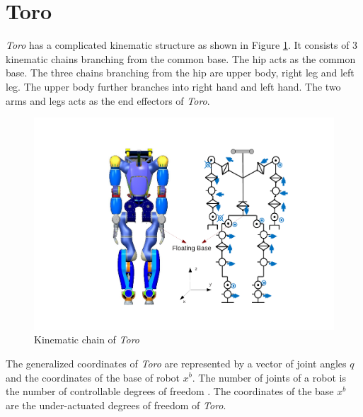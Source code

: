 \section{Toro}
\emph{Toro} has a complicated kinematic structure as shown in Figure \ref{fig:toro_kin}. It consists of 3 kinematic chains branching from the common base. The hip acts as the common base. The three chains branching from the hip are  upper body, right leg and left leg. The upper body further branches into right hand and left hand. The two arms and legs acts as the end effectors of \emph{Toro}.

\begin{figure}
\begin{center}
\includegraphics[trim= 70mm 10mm 40mm 10mm,clip,scale=0.7]{Bilder/TORO_kinematic.pdf}
\caption[Kinematic chain of \emph{Toro}]{Kinematic chain of \emph{Toro} \footnotemark }
\label{fig:toro_kin}
\end{center}
\end{figure}
The generalized coordinates of \emph{Toro} are represented by a vector of joint angles $q$ and the coordinates of the base of robot $x^b$. The number of joints of a robot is the number of controllable degrees of freedom \cite[Chapter 2]{mur94}. The coordinates of the base $x^b$ are the under-actuated degrees of freedom of \emph{Toro}. 

